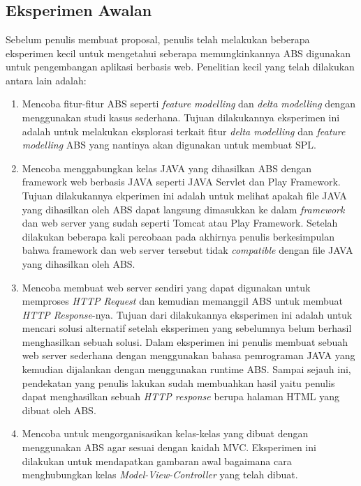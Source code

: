 \chapter{\babTiga}

\section{Eksperimen Awalan}
Sebelum penulis membuat proposal, penulis telah melakukan beberapa eksperimen kecil untuk mengetahui seberapa memungkinkannya ABS digunakan untuk pengembangan aplikasi berbasis web. Penelitian kecil yang telah dilakukan antara lain adalah:

\begin{enumerate}
    \item Mencoba fitur-fitur ABS seperti \textit{feature modelling} dan \textit{delta modelling} dengan menggunakan studi kasus sederhana. Tujuan dilakukannya eksperimen ini adalah untuk melakukan eksplorasi terkait fitur \textit{delta modelling} dan \textit{feature modelling} ABS yang nantinya akan digunakan untuk membuat SPL.
    \item Mencoba menggabungkan kelas JAVA yang dihasilkan ABS dengan framework web berbasis JAVA seperti JAVA Servlet dan Play Framework. Tujuan dilakukannya ekperimen ini adalah untuk melihat apakah file JAVA yang dihasilkan oleh ABS dapat langsung dimasukkan ke dalam \textit{framework} dan web server yang sudah seperti Tomcat atau Play Framework. Setelah dilakukan beberapa kali percobaan pada akhirnya penulis berkesimpulan bahwa framework dan web server tersebut tidak \textit{compatible} dengan file JAVA yang dihasilkan oleh ABS.
    \item Mencoba membuat web server sendiri yang dapat digunakan untuk memproses \textit{HTTP Request} dan kemudian memanggil ABS untuk membuat \textit{HTTP Response}-nya. Tujuan dari dilakukannya eksperimen ini adalah untuk mencari solusi alternatif setelah eksperimen yang sebelumnya belum berhasil menghasilkan sebuah solusi. Dalam eksperimen ini penulis membuat sebuah web server sederhana dengan menggunakan bahasa pemrograman JAVA yang kemudian dijalankan dengan menggunakan runtime ABS. Sampai sejauh ini, pendekatan yang penulis lakukan sudah membuahkan hasil yaitu penulis dapat menghasilkan sebuah \textit{HTTP response} berupa halaman HTML yang dibuat oleh ABS.
    \item Mencoba untuk mengorganisasikan kelas-kelas yang dibuat dengan menggunakan ABS agar sesuai dengan kaidah MVC. Eksperimen ini dilakukan untuk mendapatkan gambaran awal bagaimana cara menghubungkan kelas \textit{Model-View-Controller}  yang telah dibuat.
\end{enumerate}


